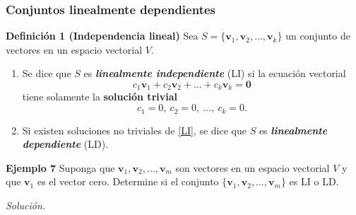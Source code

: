 {\nologo
\begin{frame}\frametitle{Conjuntos linealmente dependientes}
	
	\vspace{-2mm}
	\begin{block}{\textbf{Definición 1 (Independencia lineal)}}
		\justifying
		Sea $S=\{\mathbf{v}_1,\mathbf{v}_2,\hdots,\mathbf{v}_k\}$ un conjunto de vectores
		en un espacio vectorial $V$.
		
		\begin{enumerate}[$a$]%
			\item Se dice que $S$ es \textbf{\textit{linealmente independiente}} (LI) si
			la ecuación vectorial
			\begin{equation}\tag{1}
			c_1\mathbf{v}_1+c_2\mathbf{v}_2+\hdots+c_k\mathbf{v}_k = \mathbf{0}
			\end{equation}
			tiene solamente la \textbf{solución trivial}
			\[
			c_1 =0,\ c_2 =0,\ \hdots,\ c_k=0.
			\]
			
			\item Si existen soluciones no triviales de \eqref{LI}, se dice que $S$ es \textbf{\textit{linealmente dependiente}} (LD).
		\end{enumerate}		
	\end{block}
	
	\begin{ej}{\textbf{Ejemplo 7}} \justifying
		Suponga que $\mathbf{v}_1,\mathbf{v}_2,\hdots,\mathbf{v}_m$ son vectores en un espacio 
		vectorial $V$ y que $\mathbf{v}_1$ es el vector cero. Determine si el conjunto 
		$\{\mathbf{v}_1,\mathbf{v}_2,\hdots,\mathbf{v}_m\}$ es LI o LD.		
	\end{ej}	
	\textit{Solución.}
	
\end{frame}
}


\subsection{}

